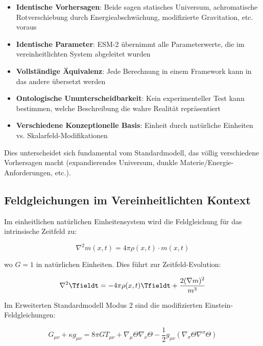	\begin{itemize}
		\item \textbf{Identische Vorhersagen}: Beide sagen statisches Universum, achromatische Rotverschiebung durch Energieabschwächung, modifizierte Gravitation, etc. voraus
		\item \textbf{Identische Parameter}: ESM-2 übernimmt alle Parameterwerte, die im vereinheitlichten System abgeleitet wurden
		\item \textbf{Vollständige Äquivalenz}: Jede Berechnung in einem Framework kann in das andere übersetzt werden
		\item \textbf{Ontologische Ununterscheidbarkeit}: Kein experimenteller Test kann bestimmen, welche Beschreibung die wahre Realität repräsentiert
		\item \textbf{Verschiedene Konzeptionelle Basis}: Einheit durch natürliche Einheiten vs. Skalarfeld-Modifikationen
	\end{itemize}
	
	Dies unterscheidet sich fundamental vom Standardmodell, das völlig verschiedene Vorhersagen macht (expandierendes Universum, dunkle Materie/Energie-Anforderungen, etc.).
	
	\subsection{Feldgleichungen im Vereinheitlichten Kontext}
	\label{subsec:field_equations_unified}
	
	Im einheitlichen natürlichen Einheitensystem wird die Feldgleichung für das intrinsische Zeitfeld zu:
	
	\begin{equation}
		\nabla^2 m(x,t) = 4\pi \rho(x,t) \cdot m(x,t)
	\end{equation}
	
	wo $G = 1$ in natürlichen Einheiten. Dies führt zur Zeitfeld-Evolution:
	
	\begin{equation}
		\nabla^2 \Tfieldt = -4\pi\rho(x,t) \Tfieldt + \frac{2(\nabla m)^2}{m^3}
	\end{equation}
	
	Im Erweiterten Standardmodell Modus 2 sind die modifizierten Einstein-Feldgleichungen:
	
	\begin{equation}
		G_{\mu\nu} + \kappa g_{\mu\nu} = 8\pi G T_{\mu\nu} + \nabla_{\mu}\Theta\nabla_{\nu}\Theta - \frac{1}{2}g_{\mu\nu}(\nabla_{\sigma}\Theta\nabla^{\sigma}\Theta)
	\end{equation}
	
